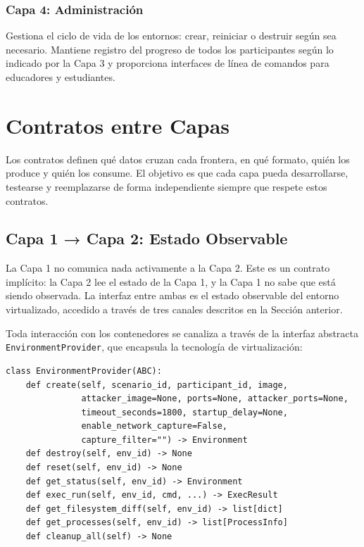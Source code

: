 \subsubsection{Capa 4: Administración}

Gestiona el ciclo de vida de los entornos: crear, reiniciar o destruir según sea
necesario. Mantiene registro del progreso de todos los participantes según lo
indicado por la Capa 3 y proporciona interfaces de línea de comandos para
educadores y estudiantes.

\section{Contratos entre Capas}

Los contratos definen qué datos cruzan cada frontera, en qué formato, quién los
produce y quién los consume. El objetivo es que cada capa pueda desarrollarse,
testearse y reemplazarse de forma independiente siempre que respete estos
contratos.

\subsection{Capa 1 → Capa 2: Estado Observable}
\label{sec:estado-observable}

La Capa 1 no comunica nada activamente a la Capa 2. Este es un contrato
implícito: la Capa 2 lee el estado de la Capa 1, y la Capa 1 no sabe que está
siendo observada. La interfaz entre ambas es el estado observable del entorno
virtualizado, accedido a través de tres canales descritos en la Sección
anterior.

\begin{sloppypar}
    Toda interacción con los contenedores se canaliza a través de la interfaz
    abstracta \texttt{EnvironmentProvider}, que encapsula la tecnología de
    virtualización:
\end{sloppypar}

\begin{verbatim}
class EnvironmentProvider(ABC):
    def create(self, scenario_id, participant_id, image,
               attacker_image=None, ports=None, attacker_ports=None,
               timeout_seconds=1800, startup_delay=None,
               enable_network_capture=False,
               capture_filter="") -> Environment
    def destroy(self, env_id) -> None
    def reset(self, env_id) -> None
    def get_status(self, env_id) -> Environment
    def exec_run(self, env_id, cmd, ...) -> ExecResult
    def get_filesystem_diff(self, env_id) -> list[dict]
    def get_processes(self, env_id) -> list[ProcessInfo]
    def cleanup_all(self) -> None
\end{verbatim}

